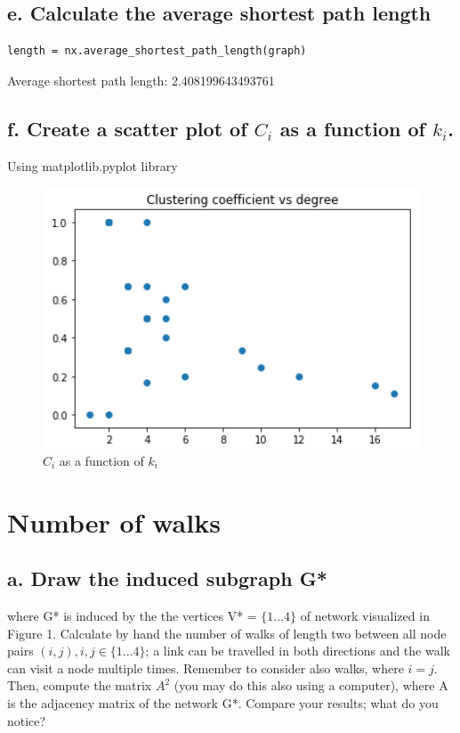 \documentclass[a4paper,12pt]{article}
\begin{document}
\clearpage

\subsection*{e. Calculate the average shortest path length}
\begin{lstlisting}
length = nx.average_shortest_path_length(graph)
\end{lstlisting}
Average shortest path length:  2.408199643493761

\subsection*{f. Create a scatter plot of $C_i$ as a function of $k_i$.}
Using matplotlib.pyplot library
\begin{figure}[h!]
	\begin{center}
    \includegraphics[scale=0.8]{graph_scatter.png}
    \caption{$C_i$ as a function of $k_i$}
	\end{center}
\end{figure}

\section{Number of walks}

\subsection*{a. Draw the induced subgraph G*}
where G* is induced by the the vertices V* = $\{1…4\}$ of network visualized in Figure 1. Calculate by hand the number of walks of length two between all node pairs $(i,j), i, j \in \{1...4\}$; a link can be travelled in both directions and the walk can visit a node multiple times. Remember to consider also walks, where $i = j$. Then, compute the matrix $A^2$ (you may do this also using a computer), where A is the adjacency matrix of the network G*. Compare your results; what do you notice? 
\end{document}
